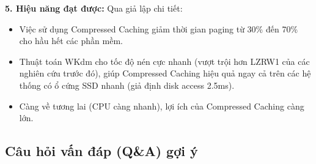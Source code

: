 \documentclass[12pt,a4paper]{article}
\begin{document}
\textbf{5. Hiệu năng đạt được:}
Qua giả lập chi tiết:
\begin{itemize}
    \item Việc sử dụng Compressed Caching giảm thời gian paging từ 30\% đến 70\% cho hầu hết các phần mềm.
    \item Thuật toán WKdm cho tốc độ nén cực nhanh (vượt trội hơn LZRW1 của các nghiên cứu trước đó), giúp Compressed Caching hiệu quả ngay cả trên các hệ thống có ổ cứng SSD nhanh (giả định disk access 2.5ms).
    \item Càng về tương lai (CPU càng nhanh), lợi ích của Compressed Caching càng lớn.
\end{itemize}

\subsection{Câu hỏi vấn đáp (Q\&A) gợi ý}
\end{document}
